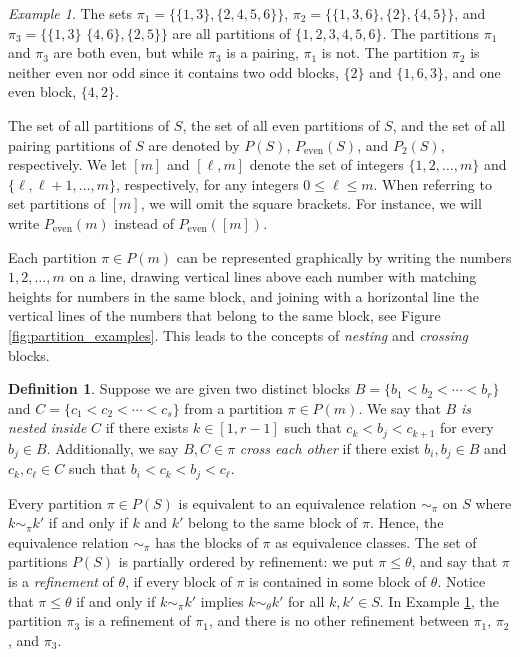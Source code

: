 \documentclass[a4paper,12pt]{extarticle}
\theoremstyle{definition}
\newtheorem{defn}[thm]{Definition}
\theoremstyle{remark}
\newtheorem{exa}[thm]{Example}
\begin{document}
\begin{exa}\label{example_partitions_1}
%
The sets $\pi_{1} = \{\{1,3\},\{2,4,5,6\}\}$, $\pi_{2} = \{\{1,3,6\},\{2\},\{4,5\}\}$, and $\pi_{3} = \{\{1,3\}  $ $\{4,6\},\{2,5\}\}$ are all partitions of $\{1,2,3,4,5,6\}$. 
%
The partitions $\pi_{1}$ and $\pi_{3}$ are both even, but while $\pi_{3}$ is a pairing, $\pi_{1}$ is not. 
%
The partition $\pi_{2}$ is neither even nor odd since it contains two odd blocks, $\{2\}$ and $\{1,6,3\}$, and one even block, $\{4,2\}$. 
%
\end{exa} 
%
%
%
%


The set of all partitions of $S$, the set of all even partitions of $S$, and the set of all pairing partitions of $S$ are denoted by $P(S)$, $P_{\text{even}}(S)$, and $P_{2}(S)$, respectively. 
%
We let $[m]$ and $[\ell,m]$ denote the set of integers $\{1,2,\ldots, m\}$ and $\{\ell,\ell+1,\ldots,m\}$, respectively, for any integers $0 \leq \ell \leq m$. 
%
When referring to set partitions of $[m]$, we will omit the square brackets. 
%
For instance, we will write $P_{\text{even}}(m)$ instead of $P_{\text{even}}([ m])$.  
%
%
%
%
%




Each partition $\pi \in P(m)$ can be represented graphically by writing the numbers $1,2,\ldots,m$ on a line, drawing vertical lines above each number with matching heights for numbers in the same block, and joining with a horizontal line the vertical lines of the numbers that belong to the same block, see Figure \ref{fig:partition_examples}. 
%
This leads to the concepts of \emph{nesting} and \emph{crossing} blocks. 
%
%
%
%

\begin{defn}
%
Suppose we are given two distinct blocks  $B=\{ b_1 < b_2 < \cdots < b_r\}$ and $C=\{ c_1 < c_2 < \cdots < c_s\}$ from a partition $\pi \in P(m)$. 
%
We say that $B$ \emph{is nested inside} $C$ if there exists $k \in [1,r-1]$ such that $c_k < b_j < c_{k+1}$ for every $b_j \in B$. 
%
Additionally, we say $B,C \in \pi$ \emph{cross each other} if there exist $b_i,b_j \in B$ and $c_k,
c_\ell \in C$ such that $b_i < c_k < b_j < c_\ell$. 
%
\end{defn}
%
%
%
%



Every partition $\pi \in P(S)$ is equivalent to an equivalence relation $\sim_{\pi}$ on $S$ where $k \sim_{\pi} {k'}$ if and only if $k$ and ${k'}$ belong to the same block of $\pi$. 
%
Hence, the equivalence relation $\sim_{\pi}$ has the blocks of $\pi$ as equivalence classes.  
%
The set of partitions $P(S)$ is partially ordered by refinement: we put $\pi \leq \theta$, and say that $\pi$ is a \emph{refinement} of $\theta$, if every block of $\pi$ is contained in some block of $\theta$. 
%
Notice that $\pi \leq \theta$ if and only if $k \sim_{\pi} {k'}$ implies $k \sim_{\theta} {k'} $ for all $k,{k'} \in S$. 
%
In Example \ref{example_partitions_1}, the partition $\pi_{3}$ is a refinement of $\pi_{1}$, and there is no other refinement between $\pi_{1}$, $\pi_{2}$, and $\pi_{3}$.  
%
%
%
%
\end{document}
